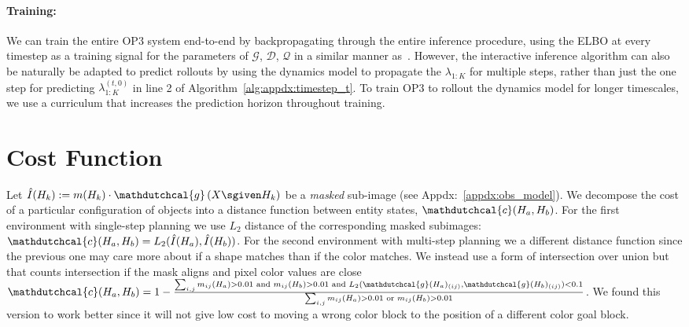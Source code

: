 \paragraph{Training:} We can train the entire OP3 system end-to-end by backpropagating through the entire inference procedure, using the ELBO at every timestep as a training signal for the parameters of $\mathcal{G}$, $\mathcal{D}$, $\mathcal{Q}$ in a similar manner as~\citep{van2018relational}.
However, the interactive inference algorithm can also be naturally be adapted to predict rollouts by using the dynamics model to propagate the $\lambda_{1:K}$ for multiple steps, rather than just the one step for predicting $\lambda_{1:K}^{(t,0)}$ in line 2 of Algorithm~\ref{alg:appdx:timestep_t}.
To train OP3 to rollout the dynamics model for longer timescales, we use a curriculum that increases the prediction horizon throughout training.

\section{Cost Function}
Let $\hat{I}(H_{k}) := m(H_k) \cdot \mathdutchcal{g}\left(X \sgiven H_k\right)$ be a \textit{masked} sub-image (see Appdx:~\ref{appdx:obs_model}).
We decompose the cost of a particular configuration of objects into a distance function between entity states, $\mathdutchcal{c}(H_a, H_b)$. For the first environment with single-step planning we use $L_2$ distance of the corresponding masked subimages: $\mathdutchcal{c}(H_a, H_b) = L_2(\hat{I}(H_a), \hat{I}(H_b))$.
For the second environment with multi-step planning we a different distance function since the previous one may care more about if a shape matches than if the color matches. We instead use a form of intersection over union but that counts intersection if the mask aligns and pixel color values are close $\mathdutchcal{c}(H_a, H_b) = 1 -  \frac{{\sum_{i,j} m_{ij}(H_a) > 0.01 \text{ and } m_{ij}(H_b) > 0.01} \text{ and } L_2(\mathdutchcal{g}(H_a)_{(ij)}, \mathdutchcal{g}(H_b)_{(ij)}) < 0.1}{\sum_{i,j} m_{ij}(H_a) > 0.01 \text{ or } m_{ij}(H_b) > 0.01}$. We found this version to work better since it will not give low cost to moving a wrong color block to the position of a different color goal block.

